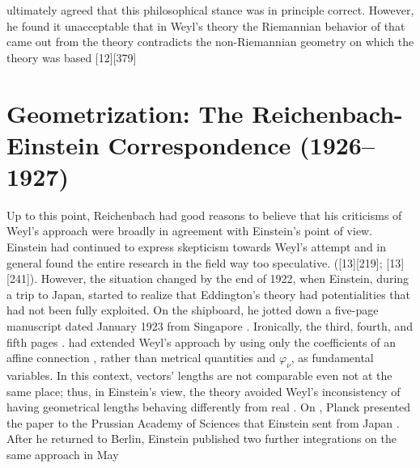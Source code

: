 \documentclass[draft]{article}
\newcommand{\phin}{\ensuremath{\varphi_\nu}\xspace}
\newcommand{\WT}{Weyl's theory\xspace}
\begin{document}
ultimately agreed that this philosophical stance was in principle correct. However, he found it unacceptable that in \WT the Riemannian behavior of \rac that came out from the theory contradicts the non-Riemannian geometry on which the theory was based [12][379]

\section{Geometrization: The Reichenbach-Einstein Correspondence (1926--1927)}
\label{geometrization}

Up to this point, Reichenbach had good reasons to believe that his criticisms of Weyl's approach were broadly in agreement with Einstein's point of view. Einstein had continued to express skepticism towards Weyl's attempt  and in general found the entire research in the field way too speculative. ([13][219]; [13][241]). However, the situation changed by the end of 1922, when Einstein, during a trip to Japan, started to realize that Eddington's theory had potentialities that had not been fully exploited. On the shipboard, he jotted down a five-page manuscript dated January 1923 from Singapore . Ironically, the third, fourth, and fifth pages  \citep{Reichenbach1921}. \citet{Eddington1921} had extended Weyl's approach by using only the coefficients of an affine connection \Gtmn, rather than metrical quantities \gmn and \phin, as fundamental variables. In this context, vectors' lengths are not comparable even not at the same place; thus, in Einstein's view, the theory avoided Weyl's inconsistency of having geometrical lengths behaving differently from real \rac. On , Planck presented the paper  to the Prussian Academy of Sciences that Einstein sent from Japan \citep{Einstein1923c}. After he returned to Berlin, Einstein published two further integrations on the same approach in May \cite{Einstein1923c,Einstein1923e}
\end{document}
